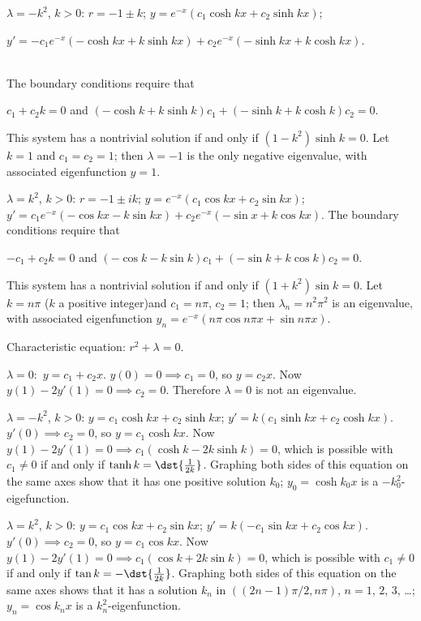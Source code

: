 \documentclass[dvips]{book}
\renewcommand{\exer}[1]{\par\medskip\;\noindent{\color{red}\bf #1.}}
\numberwithin{example}{section}
\numberwithin{equation}{section}
\numberwithin{theorem}{section}
\numberwithin{table}{section}
\numberwithin{figure}{section}
\begin{document}
 $\lambda=-k^{2}$, $k>0$: $r=-1\pm k$;
$y=e^{-x}(c_{1}\cosh kx+c_{2}\sinh kx)$;\\
\centerline{$y'=-c_{1}e^{-x}(-\cosh kx+k\sinh kx)+c_{2}e^{-x}(-\sinh
kx+k\cosh kx)$.} \\
 The boundary conditions require that\\
\centerline{$c_{1}+c_{2}k=0$ \; and  \;
$(-\cosh k+k\sinh k)c_{1}+(-\sinh k+k\cosh k)c_{2}=0$.}
\noindent
This system has a nontrivial solution if and only if  $(1-k^{2})\sinh
k=0$. Let
$k=1$ and $c_{1}=c_{2}=1$; then $\lambda=-1$ is the only negative
eigenvalue, with associated eigenfunction $y=1$.





 $\lambda=k^{2}$, $k>0$:  $r=-1\pm ik$;
 $y=e^{-x}(c_{1}\cos kx+c_{2}\sin kx)$;  \\
$y'=c_{1}e^{-x}(-\cos kx-k\sin kx)+c_{2}e^{-x}(-\sin x+k\cos kx)$.
The boundary conditions require that  \\
 \centerline{$-c_{1}+c_{2}k=0$ \; and \;
$(-\cos k-k\sin k)c_{1}+(-\sin k+k\cos k)c_{2}=0$.}
\noindent
This system has a nontrivial solution if and only if  $(1+k^{2})\sin k=0$.
Let
$k=n\pi$ ($k$ a positive integer)and $c_{1}=n\pi$, $c_{2}=1$; then
$\lambda_{n}=n^{2}\pi^{2}$ is an eigenvalue,
 with associated eigenfunction $y_{n}=e^{-x}(n\pi\cos n\pi x+\sin n\pi
x)$.



\exer{13.2.12}
Characteristic equation: $r^{2}+\lambda=0$.

$\lambda=0:$
$y=c_{1}+c_{2}x$. $y(0)=0\implies c_{1}=0$, so $y=c_{2}x$.
Now $y(1)-2y'(1)=0\implies c_{2}=0$. Therefore $\lambda=0$
is not an eigenvalue.


$\lambda=-k^{2}$, $k>0$:
$y=c_{1}\cosh kx+c_{2}\sinh kx$; $y'=k(c_{1}\sinh kx+c_{2}\cosh
kx)$. $y'(0)\implies c_{2}=0$, so $y=c_{1}\cosh kx$. Now
$y(1)-2y'(1)=0\implies  c_{1}(\cosh k-2k \sinh k)=0$, which is
possible
with $c_{1}\ne0$ if and only if   $\tanh k=\dst{\frac{1}{2k}}$. Graphing
both sides of this equation on the same axes show that it has one positive
solution
$k_{0}$;
$y_{0}=\cosh k_{0}x$ is a $-k_{0}^{2}$-eigefunction.



$\lambda=k^{2}$, $k>0$:
$y=c_{1}\cos kx+c_{2}\sin kx$; $y'=k(-c_{1}\sin kx+c_{2}\cos
kx)$. $y'(0)\implies c_{2}=0$, so $y=c_{1}\cos kx$. Now
$y(1)-2y'(1)=0\implies   c_{1}(\cos k+2k \sin k)=0$, which is
possible
with $c_{1}\ne0$ if and only if   $\tan k=-\dst{\frac{1}{2k}}$. Graphing
both sides of this equation on the same axes shows that it has
a solution $k_{n}$ in $((2n-1)\pi/2,n\pi)$, $n=1$, $2$, $3$, \dots;
$y_{n}=\cos k_{n}x$ is a
$k_{n}^{2}$-eigenfunction.
\end{document}
